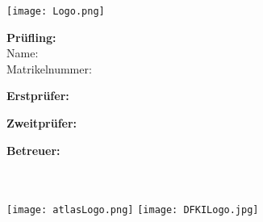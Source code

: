 \begin{titlepage}
	\begin{onehalfspace}
		\begin{center}
			\texttt{[image: Logo.png]}

			\vspace*{20mm}

			\LARGE \textbf{\Subject}

			\vspace*{10mm}

			\Huge \Title

			\vspace*{10mm}
			
			\normalsize
			\textbf{Prüfling:}\\
			\vspace*{2mm}
			Name: \Pruefling\\
			\vspace*{1mm}
			Matrikelnummer: \Matrikelnr
			\vspace*{10mm}
			
			\textbf{Erstprüfer:}\\
			\Erstpruefer

			\vspace*{1mm}

			\textbf{Zweitprüfer:}\\
			\Zweitpruefer

			\vspace*{5mm}
			
			\textbf{Betreuer:}\\
			\BetreuerA\\
			\BetreuerB\\
		\end{center}

		\vfill

		\texttt{[image: atlasLogo.png]}
		\hfill
		\texttt{[image: DFKILogo.jpg]}

		\vspace*{-1cm}
	\end{onehalfspace}
\end{titlepage}

